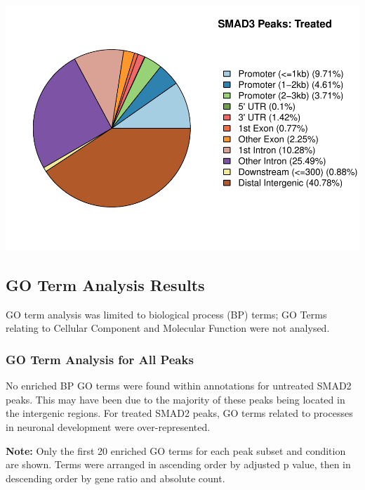 \documentclass[]{article}
\begin{document}
\includegraphics{Bioinfo_Analysis_files/figure-latex/unnamed-chunk-8-1.pdf}

\hypertarget{go-term-analysis-results}{%
\subsection{GO Term Analysis Results}\label{go-term-analysis-results}}

GO term analysis was limited to biological process (BP) terms; GO Terms
relating to Cellular Component and Molecular Function were not analysed.

\hypertarget{go-term-analysis-for-all-peaks}{%
\subsubsection{GO Term Analysis for All
Peaks}\label{go-term-analysis-for-all-peaks}}

No enriched BP GO terms were found within annotations for untreated
SMAD2 peaks. This may have been due to the majority of these peaks being
located in the intergenic regions. For treated SMAD2 peaks, GO terms
related to processes in neuronal development were over-represented.

\textbf{Note:} Only the first 20 enriched GO terms for each peak subset
and condition are shown. Terms were arranged in ascending order by
adjusted p value, then in descending order by gene ratio and absolute
count.

\clearpage{}
\end{document}
